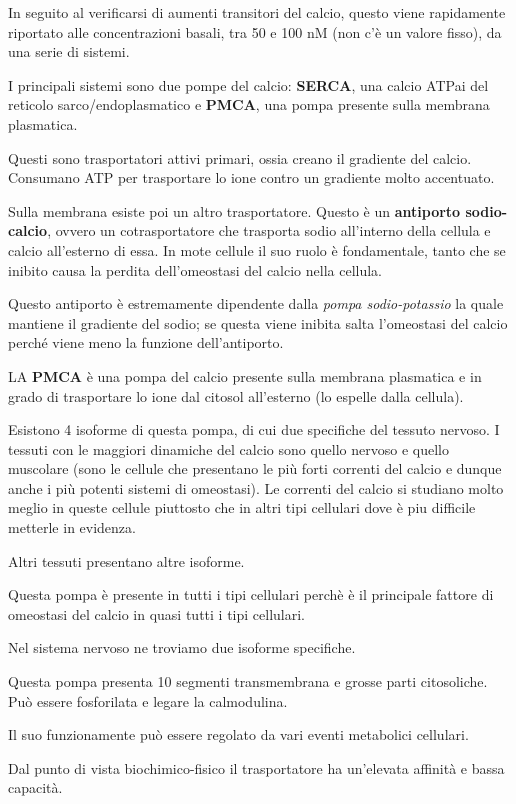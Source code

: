 \documentclass[]{article}
\begin{document}
In seguito al verificarsi di aumenti transitori del calcio, questo viene
rapidamente riportato alle concentrazioni basali, tra 50 e 100 nM (non
c'è un valore fisso), da una serie di sistemi.

I principali sistemi sono due pompe del calcio: \textbf{SERCA}, una
calcio ATPai del reticolo sarco/endoplasmatico e \textbf{PMCA}, una
pompa presente sulla membrana plasmatica.

Questi sono trasportatori attivi primari, ossia creano il gradiente del
calcio. Consumano ATP per trasportare lo ione contro un gradiente molto
accentuato.

Sulla membrana esiste poi un altro trasportatore. Questo è un
\textbf{antiporto sodio-calcio}, ovvero un cotrasportatore che trasporta
sodio all'interno della cellula e calcio all'esterno di essa. In mote
cellule il suo ruolo è fondamentale, tanto che se inibito causa la
perdita dell'omeostasi del calcio nella cellula.

Questo antiporto è estremamente dipendente dalla \emph{pompa
sodio-potassio} la quale mantiene il gradiente del sodio; se questa
viene inibita salta l'omeostasi del calcio perché viene meno la funzione
dell'antiporto.

LA \textbf{PMCA} è una pompa del calcio presente sulla membrana
plasmatica e in grado di trasportare lo ione dal citosol all'esterno (lo
espelle dalla cellula).

Esistono 4 isoforme di questa pompa, di cui due specifiche del tessuto
nervoso. I tessuti con le maggiori dinamiche del calcio sono quello
nervoso e quello muscolare (sono le cellule che presentano le più forti
correnti del calcio e dunque anche i più potenti sistemi di omeostasi).
Le correnti del calcio si studiano molto meglio in queste cellule
piuttosto che in altri tipi cellulari dove è piu difficile metterle in
evidenza.

Altri tessuti presentano altre isoforme.

Questa pompa è presente in tutti i tipi cellulari perchè è il principale
fattore di omeostasi del calcio in quasi tutti i tipi cellulari.

Nel sistema nervoso ne troviamo due isoforme specifiche.

Questa pompa presenta 10 segmenti transmembrana e grosse parti
citosoliche. Può essere fosforilata e legare la calmodulina.

Il suo funzionamente può essere regolato da vari eventi metabolici
cellulari.

Dal punto di vista biochimico-fisico il trasportatore ha un'elevata
affinità e bassa capacità.
\end{document}
